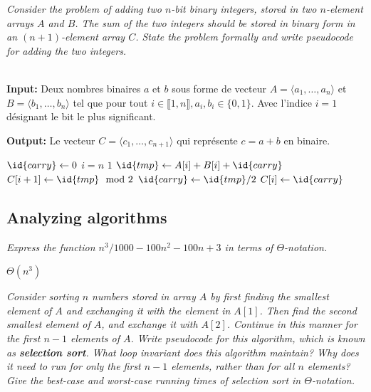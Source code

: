 \begin{description}
\begin{ex}
\end{ex}

 {\itshape Consider the problem of adding two $n$-bit binary integers, stored in two $n$-element arrays $A$ and $B$. The sum of the two integers should be stored in binary form in an $(n+1)$-element array $C$.  State the problem formally and write pseudocode for adding the two integers.}

  \begin{ex}\\
    {\bfseries Input:} Deux nombres binaires $a$ et $b$ sous forme de vecteur $A = \langle a_1, \ldots, a_n \rangle$ et $B = \langle b_1, \ldots, b_n \rangle$ tel que pour tout $i \in \llbracket 1,n \rrbracket, a_i, b_i \in \{0,1\}$. Avec l'indice $i=1$ d\'esignant le bit le plus significant.

    {\bfseries Output:} Le vecteur $C = \langle c_1, \ldots, c_{n+1} \rangle$ qui repr\'esente $c = a+b$ en binaire.
    
    \begin{codebox}
      \li $\id{carry} \gets 0 $
      \li \For $i=n$ \Downto $1$ \Do
      \li $\id{tmp} \gets A[i] + B[i] + \id{carry}$
      \li $C[i+1] \gets \id{tmp} \mod 2$
      \li $\id{carry} \gets \id{tmp}/2$\End
      \li $C[i] \gets \id{carry}$
    \end{codebox}
    
  \end{ex}
\subsection{Analyzing algorithms}

 {\itshape Express the function $n^3/1000-100n^2-100n+3$ in terms of $\Theta$-notation.}
  \begin{ex}
    $\Theta(n^3)$
  \end{ex}

 {\itshape
  Consider sorting $n$ numbers stored in array $A$ by first finding the smallest element of $A$ and exchanging it with the element in $A[1]$. Then find the second smallest element of $A$, and exchange it with $A[2]$. Continue in this manner for the first $n-1$ elements of $A$. Write pseudocode for this algorithm, which is known as {\bfseries selection sort}. What loop invariant does this algorithm maintain? Why does it need to run for only the first $n-1$ elements, rather than for all $n$ elements? Give the best-case and worst-case running times of selection sort in $\Theta$-notation.}


\end{description}
